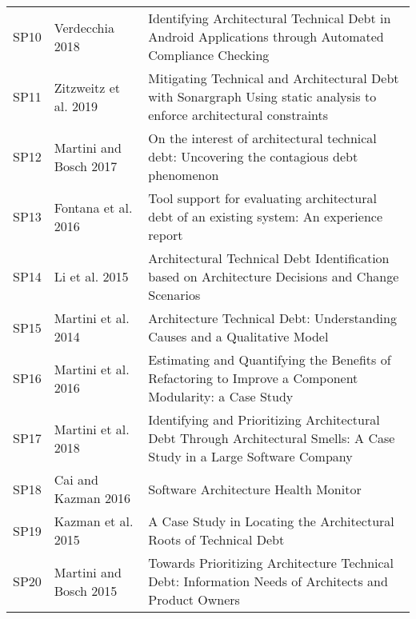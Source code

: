\begin{tabular}{lll}
 SP10 &                 Verdecchia 2018 &                                                                    Identifying Architectural Technical Debt in Android Applications through Automated Compliance Checking  \\
 SP11 &           Zitzweitz et al. 2019 &                                                    Mitigating Technical and Architectural Debt with Sonargraph Using static analysis to enforce architectural constraints  \\
 SP12 &          Martini and Bosch 2017 &                                                                                On the interest of architectural technical debt: Uncovering the contagious debt phenomenon  \\
 SP13 &             Fontana et al. 2016 &                                                                                Tool support for evaluating architectural debt of an existing system: An experience report  \\
 SP14 &                  Li et al. 2015 &                                                                          Architectural Technical Debt Identification based on Architecture Decisions and Change Scenarios  \\
 SP15 &             Martini et al. 2014 &                                                                                                 Architecture Technical Debt: Understanding Causes and a Qualitative Model  \\
 SP16 &             Martini et al. 2016 &                                                                    Estimating and Quantifying the Benefits of Refactoring to Improve a Component Modularity: a Case Study  \\
 SP17 &             Martini et al. 2018 &                                                     Identifying and Prioritizing Architectural Debt Through Architectural Smells: A Case Study in a Large Software Company \\
 SP18 &             Cai and Kazman 2016 &                                                                                                                                       Software Architecture Health Monitor \\
 SP19 &              Kazman et al. 2015 &                                                                                                         A Case Study in Locating the Architectural Roots of Technical Debt \\
 SP20 &          Martini and Bosch 2015 &                                                                      Towards Prioritizing Architecture Technical Debt: Information Needs of Architects and Product Owners  \\

\end{tabular}
